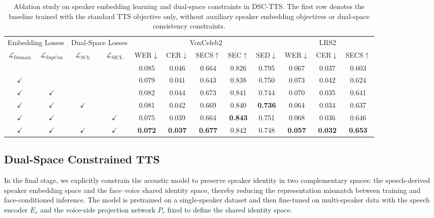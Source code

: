 \documentclass[cameraready]{Interspeech}
\begin{document}
\begin{table}[t]
\caption{Ablation study on speaker embedding learning and dual-space constraints in DSC-TTS. The first row denotes the baseline trained with the standard TTS objective only, without auxiliary speaker embedding objectives or dual-space consistency constraints.}
\label{tab:ablation}
\centering
\small
\setlength{\tabcolsep}{3.2pt}
\begin{tabular*}{\textwidth}{@{\extracolsep{\fill}}cccc|ccccc|ccc}
\toprule
\multicolumn{2}{c|}{Embedding Losses}
& \multicolumn{2}{c|}{Dual-Space Losses}
& \multicolumn{5}{c|}{VoxCeleb2}
& \multicolumn{3}{c}{LRS2} \\
$\mathcal{L}_{\mathrm{Domain}}$ & $\mathcal{L}_{\mathrm{SupCon}}$
& $\mathcal{L}_{\mathrm{SCL}}$ & $\mathcal{L}_{\mathrm{SICL}}$
& WER$\downarrow$ & CER$\downarrow$ & SECS$\uparrow$ & SEC$\uparrow$ & SED$\downarrow$
& WER$\downarrow$ & CER$\downarrow$ & SECS$\uparrow$ \\
\midrule
 &  &  &
& 0.085 & 0.046 & 0.664 & 0.826 & 0.795
& 0.067 & 0.037 & 0.603 \\
$\checkmark$ &  &  &
& 0.079 & 0.041 & 0.643 & 0.838 & 0.750
& 0.073 & 0.042 & 0.624 \\
$\checkmark$ & $\checkmark$ &  &
& 0.082 & 0.044 & 0.673 & 0.841 & 0.744
& 0.070 & 0.035 & 0.641 \\
$\checkmark$ & $\checkmark$ & $\checkmark$ &
& 0.081 & 0.042 & 0.669 & 0.840 & \textbf{0.736}
& 0.064 & 0.034 & 0.637 \\
$\checkmark$ & $\checkmark$ &  & $\checkmark$
& 0.075 & 0.039 & 0.664 & \textbf{0.843} & 0.751
& 0.068 & 0.036 & 0.646 \\
$\checkmark$ & $\checkmark$ & $\checkmark$ & $\checkmark$
& \textbf{0.072} & \textbf{0.037} & \textbf{0.677} & 0.842 & 0.748
& \textbf{0.057} & \textbf{0.032} & \textbf{0.653} \\
\bottomrule
\end{tabular*}
\end{table}

\subsection{Dual-Space Constrained TTS}

In the final stage, we explicitly constrain the acoustic model to preserve speaker identity in two complementary spaces: the speech-derived speaker embedding space and the face--voice shared identity space, thereby reducing the representation mismatch between training and face-conditioned inference. The model is pretrained on a single-speaker dataset and then fine-tuned on multi-speaker data with the speech encoder $E_s$ and the voice-side projection network $P_v$ fixed to define the shared identity space.
\end{document}

